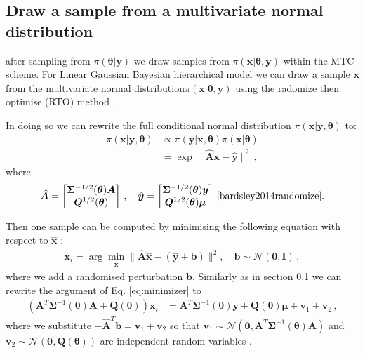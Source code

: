 \subsection{Draw a sample from a multivariate normal distribution \label{subsec:RTO}}

after sampling from $\pi(\bm{\theta}| \bm{y})$ we draw samples from $\pi(\bm{x}|\bm{\theta}, \bm{y}) $ within the MTC scheme.
For Linear Gaussian Bayesian hierarchical model we can draw a sample $\bm{x}$ from the multivariate normal distribution$\pi(\bm{x}|\bm{\theta}, \bm{y})$  using the radomize then optimise (RTO) method \cite{bardsley2012mcmc}.

In doing so we can rewrite the full conditional normal distribution $\pi( \bm{x}| \bm{y} , \bm{\theta} )$ to:
\begin{align}
	\pi(\bm{x}|\bm{y}, \bm{\theta} ) &\propto \pi(\bm{y} | \bm{x} , \bm{\theta} ) \pi(\bm{x}| \bm{\theta}) \\
	&= \exp  \lVert \hat{\bm{A}} \bm{x} - \hat{\bm{y}} \rVert^2 \, ,
\end{align}
where 
\begin{align}
	\label{eq:minimizer}
	\hat{\bm{A}} = 
	\begin{bmatrix}
		\bm{\Sigma}^{-1/2}(\bm{\theta})  \bm{A}\\
		\bm{Q}^{1/2}(\bm{\theta}) 
	\end{bmatrix} \, , \quad \hat{\bm{y}} = 
	\begin{bmatrix}
		\bm{\Sigma}^{-1/2}(\bm{\theta})  \bm{y} \\
		\bm{Q}^{1/2}(\bm{\theta}) \bm{\mu}
	\end{bmatrix} \, \text{\cite{bardsley2014randomize}}.
\end{align}

Then one sample can be computed by minimising the following equation with respect to $\hat{\bm{x}}$ :
\begin{align}
	\bm{x}_i = \arg \min_{\hat{\bm{x}}} \lVert \hat{\bm{A}} \hat{\bm{x}} - ( \hat{\bm{y}} + \bm{b} ) \rVert^2 , \quad \bm{b} \sim \mathcal{N}(\bm{0}, \mathbf{I}) \, ,
\end{align}
where we add a randomised perturbation $\bm{b}$.
Similarly as in section \ref{} we can rewrite the argument of Eq. \ref{eq:minimizer} to 
\begin{align}
	\label{eq:RTO}
	(\bm{A}^T \bm{\Sigma}^{-1}(\bm{\theta}) \bm{A}+
	\bm{Q}(\bm{\theta}) ) \bm{x}_i &= \bm{A}^T \bm{\Sigma}^{-1}(\bm{\theta}) \bm{y} +  \bm{Q}(\bm{\theta}) \bm{\mu} + \bm{v}_1 + \bm{v}_2 \,  ,
\end{align}
where we substitute $ - \hat{\bm{A}}^T  \bm{b}  = \bm{v}_1 + \bm{v}_2$ so that $\bm{v}_1 \sim \mathcal{N}(\bm{0}, \bm{A}^T \bm{\Sigma}^{-1}(\bm{\theta}) \bm{A}) $ and $\bm{v}_2 \sim \mathcal{N}(\bm{0}, \bm{Q}(\bm{\theta}) )$ are independent random variables \cite{bardsley2012mcmc, fox2016fast}.



